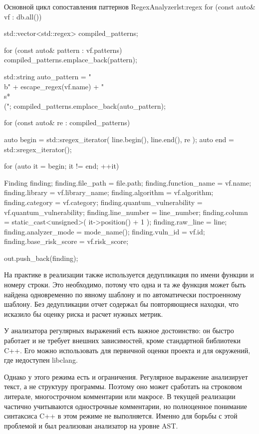 \documentclass{itmo-vkr}
\begin{document}
	
\begin{itmolisting}[C++]{Основной цикл сопоставления паттернов RegexAnalyzer}{lst:regex}
for (const auto& vf : db.all()) {
	std::vector<std::regex> compiled_patterns;
	
	for (const auto& pattern : vf.patterns) {
		compiled_patterns.emplace_back(pattern);
	}
	
	std::string auto_pattern =
	"\\b" + escape_regex(vf.name) + "\\s*\\(";
	compiled_patterns.emplace_back(auto_pattern);
	
	for (const auto& re : compiled_patterns) {
		auto begin = std::sregex_iterator(
		line.begin(), line.end(), re
		);
		auto end = std::sregex_iterator();
		
		for (auto it = begin; it != end; ++it) {
			Finding finding;
			finding.file_path = file.path;
			finding.function_name = vf.name;
			finding.library = vf.library_name;
			finding.algorithm = vf.algorithm;
			finding.category = vf.category;
			finding.quantum_vulnerability =
			vf.quantum_vulnerability;
			finding.line_number = line_number;
			finding.column = static_cast<unsigned>(
			it->position() + 1
			);
			finding.raw_line = line;
			finding.analyzer_mode = mode_name();
			finding.vuln_id = vf.id;
			finding.base_risk_score = vf.risk_score;
			
			out.push_back(finding);
		}
	}
}
\end{itmolisting}

На практике в реализации также используется дедупликация по имени функции и номеру строки. Это необходимо, потому что одна и та же функция может быть найдена одновременно по явному шаблону и по автоматически построенному шаблону. Без дедупликации отчет содержал бы повторяющиеся находки, что исказило бы оценку риска и расчет нужных метрик.

У анализатора регулярных выражений есть важное достоинство: он быстро работает и не требует внешних зависимостей, кроме стандартной библиотеки C++. Его можно использовать для первичной оценки проекта и для окружений, где недоступен libclang.

Однако у этого режима есть и ограничения. Регулярное выражение анализирует текст, а не структуру программы. Поэтому оно может сработать на строковом литерале, многострочном комментарии или макросе. В текущей реализации частично учитываются однострочные комментарии, но полноценное понимание синтаксиса C++ в этом режиме не выполняется. Именно для борьбы с этой проблемой и был реализован анализатор на уровне AST.
\end{document}
